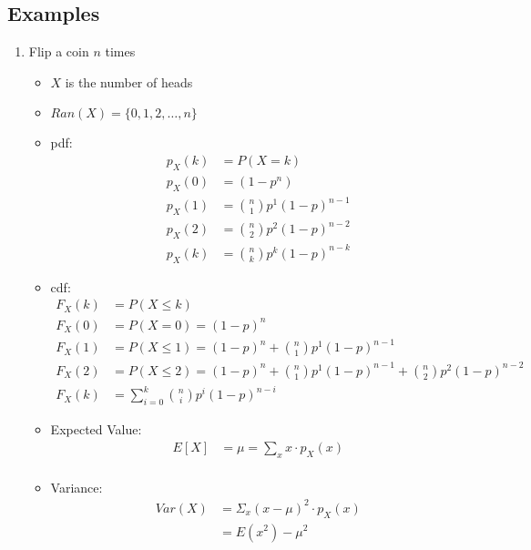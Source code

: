 \documentclass[12pt]{article}
\begin{document}
        \subsection{Examples}
            \begin{enumerate}
                \item Flip a coin $n$ times
                \begin{itemize}
                    \item $X$ is the number of heads
                    \item $Ran(X) = \{0, 1, 2, \ldots, n\}$
                    \item pdf:
                    \begin{align*}
                        p_X(k) &= P(X = k) \\
                        p_X(0) &= (1-p^n) \\
                        p_X(1) &= \binom{n}{1} p^1 {(1-p)}^{n-1} \\
                        p_X(2) &= \binom{n}{2} p^2 {(1-p)}^{n-2} \\
                        p_X(k) &= \binom{n}{k} p^k {(1-p)}^{n-k}
                    \end{align*}
                    \item cdf:
                    \begin{align*}
                        F_X(k) &= P(X \leq k) \\
                        F_X(0) &= P(X = 0) = {(1-p)}^n \\
                        F_X(1) &= P(X \leq 1) = {(1-p)}^n + \binom{n}{1} p^1 {(1-p)}^{n-1} \\
                        F_X(2) &= P(X \leq 2) = {(1-p)}^n + \binom{n}{1} p^1 {(1-p)}^{n-1} + \binom{n}{2} p^2 {(1-p)}^{n-2} \\
                        F_X(k) &= \sum_{i=0}^{k} \binom{n}{i} p^i {(1-p)}^{n-i}
                    \end{align*}
                    \item Expected Value:
                    \begin{align*}
                        E[X] &= \mu = \sum_{x} x \cdot p_X(x) \\
                    \end{align*} 
                    \item Variance:
                    \begin{align*}
                        Var(X) &= \Sigma_{x} {(x - \mu)}^2 \cdot p_X(x) \\
                        &= E(x^2) - \mu^2 \\
                    \end{align*}
                \end{itemize}
            \end{enumerate}
\end{document}
